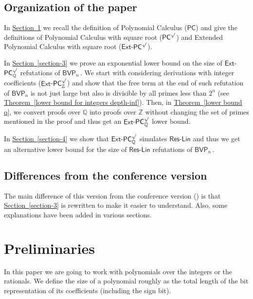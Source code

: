 \documentclass[11pt]{article}
\newcommand{\expref}[2]{\texorpdfstring{\hyperref[#2]{#1~\ref{#2}}}{#1~\ref{#2}}}
\newcommand{\Q}{{\mathbb Q}}
\newcommand{\Z}{{\mathbb Z}}
\begin{document}
%
%
%
%
%
%
%
%
%
%
%
%

\subsection{Organization of the paper}
In \expref{Section}{sec:prelim} we recall the definition of Polynomial Calculus ($\mathsf{PC}$) and give the definitions of Polynomial Calculus with square root ($\mathsf{PC}^{\surd}$) and Extended Polynomial Calculus with square root ($\mathsf{Ext}$-$\mathsf{PC}^{\surd}$).

In \expref{Section}{section-3} we prove an exponential lower bound on the size of $\mathsf{Ext}$-$\mathsf{PC}_{\Q}^{\surd}$ refutations of %
$\mathsf{BVP}_n\,.$ %
 We start with considering derivations with integer coefficients ($\mathsf{Ext}$-$\mathsf{PC}_{\Z}^{\surd}$) and show that the free term at %
the end of such refutation of $\mathsf{BVP}_n$ is not just large but also is divisible by all primes less than $2^n$ (see \expref{Theorem}{lower bound for integers depth-inf}). Then, in \expref{Theorem}{lower bound q}, we convert proofs over $\Q$ into proofs over $\Z$ without changing the set of primes mentioned in the proof and thus get an $\mathsf{Ext}$-$\mathsf{PC}_{\Q}^{\surd}$ lower bound.

In \expref{Section}{section-4} we show that $\mathsf{Ext}$-$\mathsf{PC}_{\Q}^{\surd}$ simulates $\mathsf{Res}$-$\mathsf{Lin}$ and thus we get an alternative lower bound for the size of $\mathsf{Res}$-$\mathsf{Lin}$ refutations of %
$\mathsf{BVP}_n\,.$ %

\subsection{Differences from the conference version} 
The main difference of this version from the conference version 
(\cite{conf-version}) %
is that \expref{Section}{section-3} is %
rewritten  %
to make it easier %
to understand.  %
Also, some explanations %
have been  %
added in various sections.


\section{Preliminaries}\label{sec:prelim}
In this paper we are going to work with polynomials over 
%
the integers or the rationals.  %
We define the size of a polynomial roughly as the total length of the bit representation
of its coefficients (including the sign bit).
%
%
\end{document}
